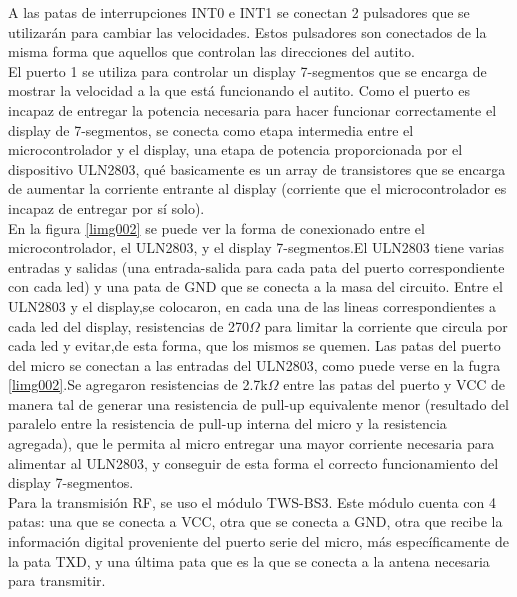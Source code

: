 \documentclass[a4paper,10pt]{article}
\begin{document}
			\indent A las patas de interrupciones INT0 e INT1 se conectan 2 pulsadores que se 					utilizarán para cambiar las velocidades. Estos pulsadores son conectados de la misma 				forma que aquellos que controlan las direcciones del autito.\\
			\indent El puerto 1 se utiliza para controlar un display 7-segmentos que se encarga de 				mostrar la velocidad a la que está funcionando el autito. Como el puerto es incapaz de 				entregar la potencia necesaria para hacer funcionar correctamente el display de
			7-segmentos, se conecta como etapa intermedia entre el microcontrolador y el display, 				una etapa de potencia proporcionada por el dispositivo ULN2803, qué basicamente es un 				array de transistores que se encarga de aumentar la corriente entrante al display 					(corriente que el microcontrolador es incapaz de entregar por sí solo).\\
			\indent En la figura \ref{limg002} se puede ver la forma de conexionado entre el 					microcontrolador, el ULN2803, y el display 7-segmentos.El ULN2803 tiene varias entradas
			y salidas (una entrada-salida para cada pata del puerto correspondiente con cada
			led) y una pata de GND que se conecta a la masa del circuito. Entre el ULN2803 y el
			display,se colocaron, en cada una de las lineas correspondientes a cada led del
			display, resistencias de 270$\Omega$ para limitar la corriente que circula por cada led
			y evitar,de esta forma, que los mismos se quemen. Las patas del puerto del micro se
			conectan a las entradas del ULN2803, como puede verse en la fugra \ref{limg002}.Se
			agregaron resistencias de 2.7k$\Omega$ entre las patas del puerto y VCC de manera tal 				de generar una resistencia de pull-up equivalente menor (resultado del paralelo entre 				la resistencia de pull-up interna del micro y la resistencia agregada), que le permita
			al micro entregar una mayor corriente necesaria para alimentar al ULN2803, y conseguir 				de esta forma el correcto funcionamiento del display 7-segmentos.\\
			\indent Para la transmisión RF, se uso el módulo TWS-BS3. Este módulo cuenta con 4 					patas: una que se conecta a VCC, otra que se conecta a GND, otra que recibe 						la información digital proveniente del puerto serie del micro, más específicamente de
			la pata TXD, y una última pata que es la que se conecta a la antena necesaria para 					transmitir.\\
			
			
			
\end{document}
